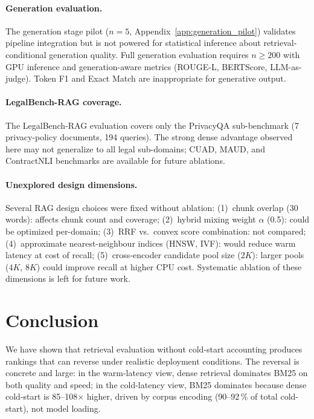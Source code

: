 \documentclass[11pt,a4paper]{article}
\begin{document}
\paragraph{Generation evaluation.}
The generation stage pilot ($n=5$, Appendix~\ref{app:generation_pilot})
validates pipeline integration but is not powered for statistical inference
about retrieval-conditional generation quality.
Full generation evaluation requires $n \geq 200$ with GPU inference and
generation-aware metrics (ROUGE-L, BERTScore, LLM-as-judge).
Token F1 and Exact Match are inappropriate for generative output.

\paragraph{LegalBench-RAG coverage.}
The LegalBench-RAG evaluation covers only the PrivacyQA sub-benchmark (7
privacy-policy documents, 194 queries).
The strong dense advantage observed here may not generalize to all legal
sub-domains; CUAD, MAUD, and ContractNLI benchmarks are available for future
ablations.

\paragraph{Unexplored design dimensions.}
Several RAG design choices were fixed without ablation:
(1)~chunk overlap (30 words): affects chunk count and coverage;
(2)~hybrid mixing weight $\alpha$ (0.5): could be optimized per-domain;
(3)~RRF vs.\ convex score combination: not compared;
(4)~approximate nearest-neighbour indices (HNSW, IVF): would reduce warm
latency at cost of recall;
(5)~cross-encoder candidate pool size ($2K$): larger pools ($4K$, $8K$) could
improve recall at higher CPU cost.
Systematic ablation of these dimensions is left for future work.

\section{Conclusion}
\label{sec:conclusion}

We have shown that retrieval evaluation without cold-start accounting produces
rankings that can reverse under realistic deployment conditions.
The reversal is concrete and large: in the warm-latency view, dense retrieval
dominates BM25 on both quality and speed; in the cold-latency view, BM25
dominates because dense cold-start is 85--108$\times$ higher, driven by
corpus encoding (90--92\,\% of total cold-start), not model loading.
\end{document}
